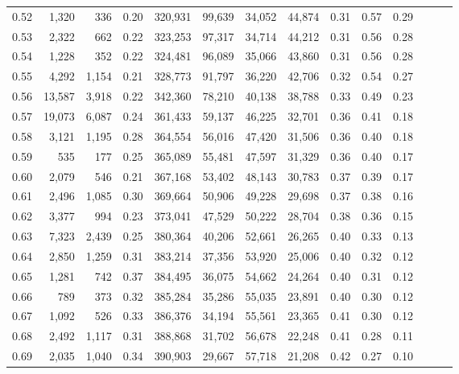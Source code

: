\begin{tabular}{rrrrrrrrrrrrrr}
0.52 &   1,320 &    336 &  0.20 &  320,931 &   99,639 &  34,052 &  44,874 &  0.31 &  0.57 &      0.29 \\
0.53 &   2,322 &    662 &  0.22 &  323,253 &   97,317 &  34,714 &  44,212 &  0.31 &  0.56 &      0.28 \\
0.54 &   1,228 &    352 &  0.22 &  324,481 &   96,089 &  35,066 &  43,860 &  0.31 &  0.56 &      0.28 \\
0.55 &   4,292 &  1,154 &  0.21 &  328,773 &   91,797 &  36,220 &  42,706 &  0.32 &  0.54 &      0.27 \\
0.56 &  13,587 &  3,918 &  0.22 &  342,360 &   78,210 &  40,138 &  38,788 &  0.33 &  0.49 &      0.23 \\
0.57 &  19,073 &  6,087 &  0.24 &  361,433 &   59,137 &  46,225 &  32,701 &  0.36 &  0.41 &      0.18 \\
0.58 &   3,121 &  1,195 &  0.28 &  364,554 &   56,016 &  47,420 &  31,506 &  0.36 &  0.40 &      0.18 \\
0.59 &     535 &    177 &  0.25 &  365,089 &   55,481 &  47,597 &  31,329 &  0.36 &  0.40 &      0.17 \\
0.60 &   2,079 &    546 &  0.21 &  367,168 &   53,402 &  48,143 &  30,783 &  0.37 &  0.39 &      0.17 \\
0.61 &   2,496 &  1,085 &  0.30 &  369,664 &   50,906 &  49,228 &  29,698 &  0.37 &  0.38 &      0.16 \\
0.62 &   3,377 &    994 &  0.23 &  373,041 &   47,529 &  50,222 &  28,704 &  0.38 &  0.36 &      0.15 \\
0.63 &   7,323 &  2,439 &  0.25 &  380,364 &   40,206 &  52,661 &  26,265 &  0.40 &  0.33 &      0.13 \\
0.64 &   2,850 &  1,259 &  0.31 &  383,214 &   37,356 &  53,920 &  25,006 &  0.40 &  0.32 &      0.12 \\
0.65 &   1,281 &    742 &  0.37 &  384,495 &   36,075 &  54,662 &  24,264 &  0.40 &  0.31 &      0.12 \\
0.66 &     789 &    373 &  0.32 &  385,284 &   35,286 &  55,035 &  23,891 &  0.40 &  0.30 &      0.12 \\
0.67 &   1,092 &    526 &  0.33 &  386,376 &   34,194 &  55,561 &  23,365 &  0.41 &  0.30 &      0.12 \\
0.68 &   2,492 &  1,117 &  0.31 &  388,868 &   31,702 &  56,678 &  22,248 &  0.41 &  0.28 &      0.11 \\
0.69 &   2,035 &  1,040 &  0.34 &  390,903 &   29,667 &  57,718 &  21,208 &  0.42 &  0.27 &      0.10 \\

\end{tabular}
